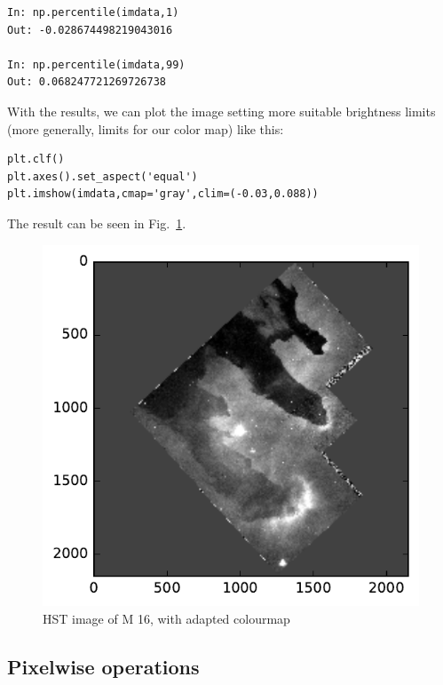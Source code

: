 \documentclass[twocolumn,apj]{openjournal}
\begin{document}
\begin{lstlisting}
In: np.percentile(imdata,1)
Out: -0.028674498219043016

In: np.percentile(imdata,99)
Out: 0.068247721269726738
\end{lstlisting}
With the results, we can plot the image setting more suitable brightness limits (more generally, limits for our color map) like this:
\begin{lstlisting}
plt.clf()
plt.axes().set_aspect('equal')
plt.imshow(imdata,cmap='gray',clim=(-0.03,0.088))
\end{lstlisting}
The result can be seen in Fig.~\ref{ImshowM16}.
\begin{figure}[htbp]
\begin{center}
\includegraphics[width=\linewidth]{m16-lim.pdf}
\caption{HST image of M 16, with adapted colourmap}
\label{ImshowM16}
\end{center}
\end{figure}

\subsection{Pixelwise operations}
\end{document}
